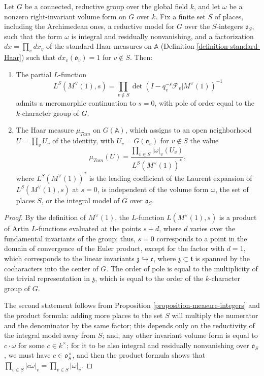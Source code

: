 	
\begin{proposition}
\label{proposition-Tamagawa-canonical}
		Let $G$ be a connected, reductive group over the global field $k$, and let $\omega$ be a nonzero right-invariant volume form on $G$ over $k$. Fix a finite set $S$ of places, including the Archimedean ones, a reductive model for $G$ over the $S$-integers $\mathfrak o_S$, such that the form $\omega$ is integral and residually nonvanishing, and a factorization $dx = \prod_v dx_v$ of the standard Haar measures on $\mathbb A$ (Definition \ref{definition-standard-Haar}) such that $dx_v(\mathfrak o_v) = 1$ for $v\notin S$. Then:
		\begin{enumerate}
			\item The partial $L$-function 
			$$ L^S(M^\vee(1), s)= \prod_{v\notin S} \det(I- q_v^{-s} \mathcal F_v|M^\vee(1))^{-1}$$
			admits a meromorphic continuation to $s=0$, with pole of order equal to the $k$-character group of $G$.
			\item The Haar measure $\mu_{Tam}$ on $G(\mathbb A)$, which assigns to an open neighborhood $U= \prod_v U_v$ of the identity, with $U_v = G(\mathfrak o_v)$ for $v\notin S$ the value 
			$$ \mu_{Tam}(U) = \frac{\prod_{v\in S} |\omega|_v(U_v)}{L^S(M^\vee(1))^* },$$
			where $L^S(M^\vee(1))^*$ is the leading coefficient of the Laurent expansion of $L^S(M^\vee(1),s)$ at $s=0$, is independent of the volume form $\omega$, the set of places $S$, or the integral model of $G$ over $\mathfrak o_S$.
		\end{enumerate}
		
\end{proposition}
	
	
\begin{proof}
	By the definition of $M^\vee(1)$, the $L$-function 	$L(M^\vee(1), s)$ is a product of Artin $L$-functions evaluated at the points $s+d$, where $d$ varies over the fundamental invariants of the group; thus, $s=0$ corresponds to a point in the domain of convergence of the Euler product, except for the factor with $d=1$, which corresponds to the linear invariants $\mathfrak z \hookrightarrow \mathfrak c$, where $\mathfrak z\subset\mathfrak t$ is spanned by the cocharacters into the center of $G$. The order of pole is equal to the multiplicity of the trivial representation in $\mathfrak z$, which is equal to the order of the $k$-character group of $G$.
		
	The second statement follows from Proposition \ref{proposition-measure-integers} and the product formula: adding more places to the set $S$ will multiply the numerator and the denominator by the same factor; this depends only on the reductivity of the integral model away from $S$; and, any other invariant volume form is equal to $c\cdot \omega$ for some $c\in k^\times$; for it to be also integral and residually nonvanishing over $\mathfrak o_S$, we must have $c\in \mathfrak o_S^\times$, and then the product formula shows that $\prod_{v\in S} |c\omega|_v = \prod_{v\in S} |\omega|_v$. 
\end{proof}
	

